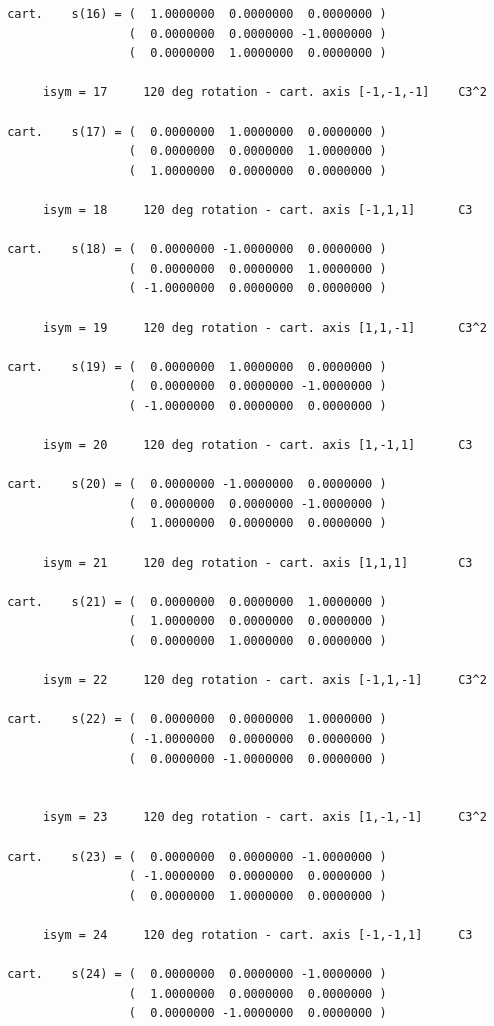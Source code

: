\documentclass[12pt,a4paper]{article}
\begin{document}
\begin{verbatim}
 cart.    s(16) = (  1.0000000  0.0000000  0.0000000 )
                  (  0.0000000  0.0000000 -1.0000000 )
                  (  0.0000000  1.0000000  0.0000000 )

      isym = 17     120 deg rotation - cart. axis [-1,-1,-1]    C3^2

 cart.    s(17) = (  0.0000000  1.0000000  0.0000000 )
                  (  0.0000000  0.0000000  1.0000000 )
                  (  1.0000000  0.0000000  0.0000000 )

      isym = 18     120 deg rotation - cart. axis [-1,1,1]      C3

 cart.    s(18) = (  0.0000000 -1.0000000  0.0000000 )
                  (  0.0000000  0.0000000  1.0000000 )
                  ( -1.0000000  0.0000000  0.0000000 )

      isym = 19     120 deg rotation - cart. axis [1,1,-1]      C3^2

 cart.    s(19) = (  0.0000000  1.0000000  0.0000000 )
                  (  0.0000000  0.0000000 -1.0000000 )
                  ( -1.0000000  0.0000000  0.0000000 )

      isym = 20     120 deg rotation - cart. axis [1,-1,1]      C3

 cart.    s(20) = (  0.0000000 -1.0000000  0.0000000 )
                  (  0.0000000  0.0000000 -1.0000000 )
                  (  1.0000000  0.0000000  0.0000000 )

      isym = 21     120 deg rotation - cart. axis [1,1,1]       C3

 cart.    s(21) = (  0.0000000  0.0000000  1.0000000 )
                  (  1.0000000  0.0000000  0.0000000 )
                  (  0.0000000  1.0000000  0.0000000 )

      isym = 22     120 deg rotation - cart. axis [-1,1,-1]     C3^2

 cart.    s(22) = (  0.0000000  0.0000000  1.0000000 )
                  ( -1.0000000  0.0000000  0.0000000 )
                  (  0.0000000 -1.0000000  0.0000000 )


      isym = 23     120 deg rotation - cart. axis [1,-1,-1]     C3^2

 cart.    s(23) = (  0.0000000  0.0000000 -1.0000000 )
                  ( -1.0000000  0.0000000  0.0000000 )
                  (  0.0000000  1.0000000  0.0000000 )

      isym = 24     120 deg rotation - cart. axis [-1,-1,1]     C3

 cart.    s(24) = (  0.0000000  0.0000000 -1.0000000 )
                  (  1.0000000  0.0000000  0.0000000 )
                  (  0.0000000 -1.0000000  0.0000000 )



\end{verbatim}
\end{document}
